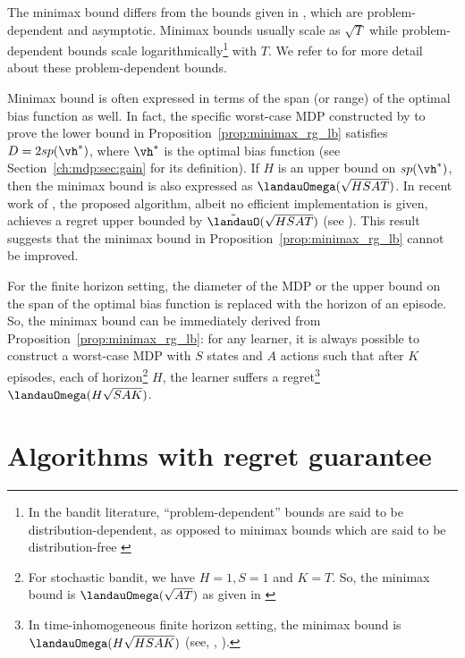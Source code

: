 The minimax bound differs from the bounds given in \cite{ok2018exploration, burnetas1997optimal}, which are problem-dependent and asymptotic.
Minimax bounds usually scale as $\sqrt{T}$ while problem-dependent bounds scale logarithmically\footnote{In the bandit literature, “problem-dependent” bounds are said to be distribution-dependent, as opposed to minimax bounds which are said to be distribution-free \cite{garivier2019explore}} with $T$.
We refer to \cite{ok2018exploration, burnetas1997optimal} for more detail about these problem-dependent bounds.

Minimax bound is often expressed in terms of the span (or range) of the optimal bias function as well.
In fact, the specific worst-case MDP constructed by \cite{jaksch2010near} to prove the lower bound in Proposition~\ref{prop:minimax_rg_lb} satisfies $D=2sp(\vh^*)$, where $\vh^*$ is the optimal bias function (see Section~\ref{ch:mdp:sec:gain} for its definition).
If $H$ is an upper bound on $sp(\vh^*)$, then the minimax bound is also expressed as $\landauOmega(\sqrt{HSAT})$.
In recent work of \cite{zhang2019regret}, the proposed algorithm, albeit no efficient implementation is given, achieves a regret upper bounded by $\tilde{\landauO}(\sqrt{HSAT})$ (see \cite[Theorem~1]{zhang2019regret}).
This result suggests that the minimax bound in Proposition~\ref{prop:minimax_rg_lb} cannot be improved.

For the finite horizon setting, the diameter of the MDP or the upper bound on the span of the optimal bias function is replaced with the horizon of an episode.
So, the minimax bound can be immediately derived from Proposition~\ref{prop:minimax_rg_lb}: for any learner, it is always possible to construct a worst-case MDP with $S$ states and $A$ actions such that after $K$ episodes, each of horizon\footnote{For stochastic bandit, we have $H=1, S=1$ and $K=T$. So, the minimax bound is $\landauOmega(\sqrt{AT})$ as given in \cite{bubeck2012regret}} $H$, the learner suffers a regret\footnote{In time-inhomogeneous finite horizon setting, the minimax bound is $\landauOmega(H\sqrt{HSAK})$ (see, \eg, \cite{jin2018q, domingues2021episodic}).} $\landauOmega(H\sqrt{SAK})$.


\section{Algorithms with regret guarantee}
\label{ch:rl:sec:opt_post}


